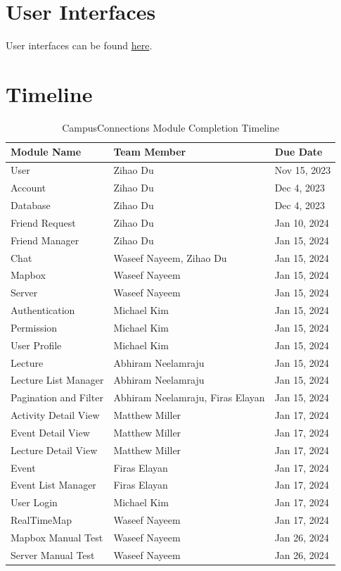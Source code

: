 \documentclass[12pt, titlepage]{article}
\begin{document}
\section{User Interfaces}

User interfaces can be found \href{https://www.figma.com/file/4kCzs4a1iqRLSKAwUbJREh/UI-Feedback?type=design&node-id=0%3A1&mode=design&t=6hfaqfbeFLTKRl9E-1}{here}.

\section{Timeline}
\begin{table}[H]
\centering
\begin{tabular}{p{} p{}  p{}}
\toprule
Module Name & Team Member & Due Date \\
\midrule
User & Zihao Du & Nov 15, 2023\\
Account & Zihao Du & Dec 4, 2023\\
Database & Zihao Du & Dec 4, 2023\\
Friend Request & Zihao Du & Jan 10, 2024\\
Friend Manager & Zihao Du & Jan 15, 2024\\
Chat & Waseef Nayeem, Zihao Du & Jan 15, 2024\\
Mapbox & Waseef Nayeem & Jan 15, 2024\\
Server & Waseef Nayeem & Jan 15, 2024\\
Authentication & Michael Kim & Jan 15, 2024\\
Permission & Michael Kim & Jan 15, 2024\\
User Profile & Michael Kim & Jan 15, 2024\\
Lecture & Abhiram Neelamraju & Jan 15, 2024\\
Lecture List Manager & Abhiram Neelamraju & Jan 15, 2024\\
Pagination and Filter & Abhiram Neelamraju, Firas Elayan & Jan 15, 2024\\
Activity Detail View & Matthew Miller & Jan 17, 2024\\
Event Detail View & Matthew Miller & Jan 17, 2024\\
Lecture Detail View & Matthew Miller & Jan 17, 2024\\
Event & Firas Elayan & Jan 17, 2024\\
Event List Manager & Firas Elayan & Jan 17, 2024\\
User Login & Michael Kim & Jan 17, 2024\\
RealTimeMap & Waseef Nayeem & Jan 17, 2024\\
Mapbox Manual Test & Waseef Nayeem & Jan 26, 2024\\
Server Manual Test & Waseef Nayeem & Jan 26, 2024\\
\bottomrule
\end{tabular}
\caption{CampusConnections Module Completion Timeline}
\end{table}
\end{document}
